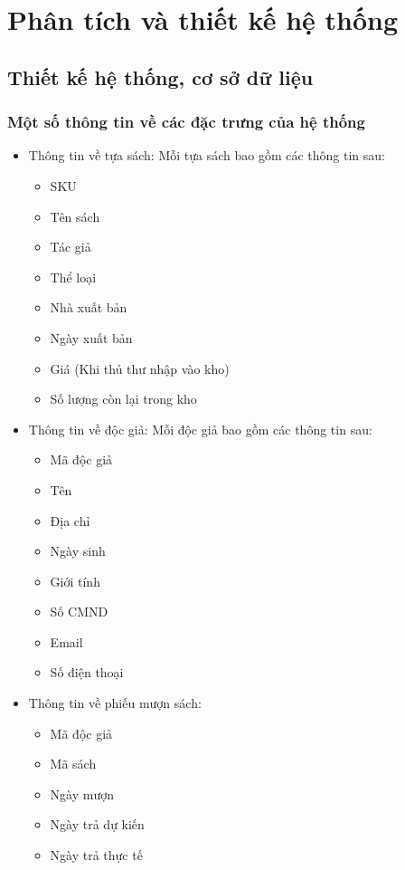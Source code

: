 \documentclass[12pt]{report}
\begin{document}
	\chapter{Phân tích và thiết kế hệ thống}
		\label{system_analysis}	
		\section{Thiết kế hệ thống, cơ sở dữ liệu}			
			\label{database_design}
			\subsection{Một số thông tin về các đặc trưng của hệ thống}
				\begin{itemize}
					\item{Thông tin về tựa sách:} Mỗi tựa sách bao gồm các thông tin sau:
						\begin{itemize}
							\item SKU
							\item Tên sách
							\item Tác giả
							\item Thể loại
							\item Nhà xuất bản
							\item Ngày xuất bản
							\item Giá (Khi thủ thư nhập vào kho)
							\item Số lượng còn lại trong kho
						\end{itemize}
						\item{Thông tin về độc giả:} Mỗi độc giả bao gồm các thông tin sau:
						\begin{itemize}
							\item Mã độc giả
							\item Tên 
							\item Địa chỉ
							\item Ngày sinh
							\item Giới tính
							\item Số CMND
							\item Email
							\item Số điện thoại
						\end{itemize}
						\item{Thông tin về phiếu mượn sách:} 
						\begin{itemize}
							\item Mã độc giả
							\item Mã sách
							\item Ngày mượn
							\item Ngày trả dự kiến
							\item Ngày trả thực tế
						\end{itemize}
				\end{itemize}
\end{document}
